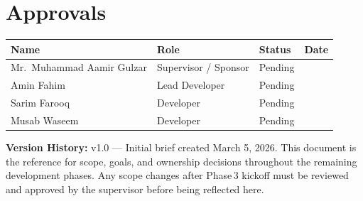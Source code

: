 ﻿\documentclass[12pt, a4paper]{article}
\newcommand{\thead}[1]{\cellcolor{headerbg}\textcolor{headertext}{\textbf{#1}}}
\newcommand{\talt}{\rowcolor{rowalt}}
\newcommand{\pending}{\textcolor{statuspending}{Pending}}
\begin{document}
\section{Approvals}

\begin{tabular}{>{\raggedright\arraybackslash}p{4.0cm}
                >{\raggedright\arraybackslash}p{3.4cm}
                >{\centering\arraybackslash}p{2.4cm}
                >{\centering\arraybackslash}p{3.0cm}}
  \toprule
  \thead{Name} & \thead{Role} & \thead{Status} & \thead{Date} \\
  \midrule
  Mr.\ Muhammad Aamir Gulzar & Supervisor / Sponsor & \pending & \\
  \talt
  Amin Fahim                 & Lead Developer       & \pending & \\
  Sarim Farooq               & Developer            & \pending & \\
  \talt
  Musab Waseem               & Developer            & \pending & \\
  \bottomrule
\end{tabular}

\vspace{24pt}
\begin{mdframed}[
  backgroundcolor   = lightgray,
  linecolor         = medgray,
  innertopmargin    = 10pt,
  innerbottommargin = 10pt,
  innerleftmargin   = 12pt,
  innerrightmargin  = 12pt,
  roundcorner       = 3pt
]
  {\small\color{darkgray}
    \textbf{Version History:} v1.0 --- Initial brief created March 5, 2026.
    This document is the reference for scope, goals, and ownership decisions
    throughout the remaining development phases. Any scope changes after
    Phase\,3 kickoff must be reviewed and approved by the supervisor before
    being reflected here.}
\end{mdframed}
\end{document}
